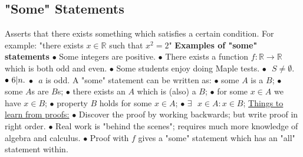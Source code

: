 \documentclass{article}
\begin{document}
\subsection{"Some" Statements}
Asserts that there exists something which satisfies a certain condition.
\newline
\newline
{}
\newline
\newline
For example: "there exists $x \in \mathbb{R}$ such that $x^2 = 2$"
\newline
\newline 
\textbf{Examples of "some" statements}
\newline
\newline
$\bullet$ Some integers are positive.
\newline
$\bullet$ There exists a function $f: \mathbb{R} \rightarrow \mathbb{R}$ which is both odd and even.
\newline
$\bullet$ Some students enjoy doing Maple tests.
\newline
$\bullet \text{  } S \neq \emptyset.$
\newline
$\bullet \text{  } 6 \arrowvert n.$
\newline
$\bullet \text{  } a$ is odd.
\newline
\newline
A "some" statement can be written as:
\newline
\newline
$\bullet$ some $A$ is a $B$;
\newline
$\bullet$ some $A$s are $B$s;
\newline
$\bullet$ there exists an $A$ which is (also) a $B$;
\newline
$\bullet$ for some $x \in A$ we have $x \in B$;
\newline
$\bullet$ property $B$ holds for some $x \in A$;
\newline
$\bullet$ $\exists \text{ } x \in A : x \in B$;
\newline
{}
\newline
\newline
\underline{Things to learn from proofs:}
\newline
\newline
$\bullet$ Discover the proof by working backwards; but write proof in right order.
\newline
$\bullet$ Real work is "behind the scenes"; requires much more knowledge of algebra and calculus.
\newline
$\bullet$ Proof with $f$ gives a "some" statement which has an "all" statement within.
\newpage
\end{document}
